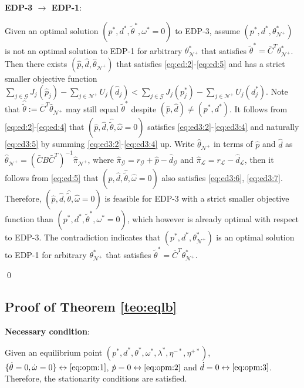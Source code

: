 \documentclass[journal,12pt,onecolumn,draftclsnofoot]{IEEEtran}
\begin{document}
\noindent\textbf{EDP-3 $\rightarrow$ EDP-1}:

Given an optimal solution $(p^*,d^*, \tilde \theta^*,\omega^*=0)$ to EDP-3, assume $(p^*,d^*,\theta_{\mathcal{N}^+}^*)$ is not an optimal solution to EDP-1 for arbitrary $\theta_{\mathcal{N}^+}^*$ that satisfies $\tilde\theta^*=\bar{C}^T \theta_{\mathcal{N}^+}^*$. Then there exists $(\hat{p},\hat{d},\hat \theta_{\mathcal{N}^+})$ that satisfies \eqref{eq:ed:2}-\eqref{eq:ed:5} and has a strict smaller objective function $\sum_{j\in\mathcal{G}}J_j(\hat p_j)-\sum_{j\in\mathcal{N}^+}U_j(\hat d_j) < \sum_{j\in\mathcal{G}}J_j( p^*_j)-\sum_{j\in\mathcal{N}^+}U_j( d^*_j)$. Note that $\hat{\tilde{\theta}}:=\bar{C}^T \hat \theta_{\mathcal{N}^+}$ may still equal $\tilde \theta^*$ despite $(\hat{p},\hat{d}) \neq (p^*,d^*)$. It follows from \eqref{eq:ed:2}-\eqref{eq:ed:4} that $(\hat{p},\hat{d},\hat{\tilde{\theta}},\hat \omega=0)$ satisfies \eqref{eq:ed3:2}-\eqref{eq:ed3:4} and naturally \eqref{eq:ed3:5} by summing \eqref{eq:ed3:2}-\eqref{eq:ed3:4} up. Write $\hat\theta_{\mathcal{N}^+}$ in terms of $\hat{p}$ and $\hat{d}$ as $\hat\theta_{\mathcal{N}^+}=(\bar{C}B\bar{C}^T)^{-1}\hat \pi_{\mathcal{N}^+}$, where $\hat \pi_{\mathcal{G}} =r_\mathcal{G}+\hat{p}-\hat d_\mathcal{G}$ and $\hat \pi_{\mathcal{L}}=r_\mathcal{L}-\hat d_\mathcal{L}$, then it follows from \eqref{eq:ed:5} that $(\hat{p},\hat{d},\hat{\tilde{\theta}},\hat \omega=0)$ also satisfies \eqref{eq:ed3:6}, \eqref{eq:ed3:7}. Therefore, $(\hat{p},\hat{d},\hat{\tilde{\theta}},\hat \omega=0)$ is feasible for EDP-3 with a strict smaller objective function than $(p^*,d^*, \tilde \theta^*,\omega^*=0)$, which however is already optimal with respect to EDP-3. The contradiction indicates that $(p^*,d^*,\theta_{\mathcal{N}^+}^*)$ is an optimal solution to EDP-1 for arbitrary $\theta_{\mathcal{N}^+}^*$ that satisfies $\tilde\theta^*=\bar{C}^T \theta_{\mathcal{N}^+}^*$.  



\qed

\subsection{Proof of Theorem \ref{teo:eqlb}}

\noindent
\textbf{Necessary condition}:

Given an equilibrium point $(p^*,d^*,\theta^*,\omega^*,\lambda^*,\eta^{-*},\eta^{+*})$,
$\{\dot{\theta}=0, \dot{\omega}=0\} \leftrightarrow \eqref{eq:opm:1}$, 
$\dot{p}=0 \leftrightarrow \eqref{eq:opm:2}$ and $\dot{d}=0 \leftrightarrow \eqref{eq:opm:3}$. Therefore, the stationarity conditions are satisfied.
\end{document}
